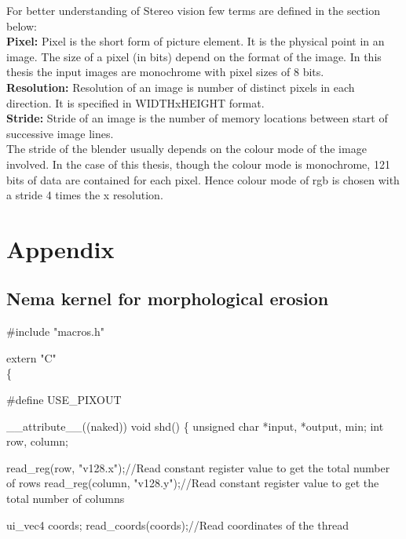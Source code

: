 For better understanding of Stereo vision few terms are defined in the section below:\\

{\bf Pixel\cite{olea_introduction_2015}:} Pixel is the short form of picture element. It is the physical point in an image. The size of a pixel (in bits) depend on the format of the image. In this thesis the input images are monochrome with pixel sizes of 8 bits.\\

{\bf Resolution\cite{olea_introduction_2015}:} Resolution of an image is number of distinct pixels in each direction. It is specified in WIDTHxHEIGHT format.\\

{\bf Stride\cite{olea_introduction_2015}:} Stride of an image is the number of memory locations between start of successive image lines.\\

The stride of the blender usually depends on the colour mode of the image involved. In the case of this thesis, though the colour mode is monochrome, 121 bits of data are contained for each pixel. Hence colour mode of rgb is chosen with a stride 4 times the x resolution.


\chapter{Appendix}
\label{chap:appendix}

\section{Nema kernel for morphological erosion}
\label{s:kerero}

\#include "macros.h"

extern "C" \\
\{

  \#define USE\_PIXOUT

  \_\_attribute\_\_((naked)) void shd()
  \{
    unsigned char *input, *output, min;
    int row, column;

    read\_reg(row, "v128.x");//Read constant register value to get the total number of rows
    read\_reg(column, "v128.y");//Read constant register value to get the total number of columns
  
    ui\_vec4 coords;
    read\_coords(coords);//Read coordinates of the thread
    
